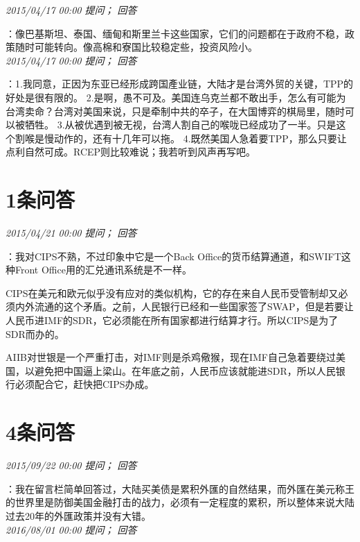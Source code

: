 \documentclass[twocolumn]{ctexart}
\begin{document}
\textit{\hfill\noindent\small 2015/04/17 00:00 提问； 回答}

：像巴基斯坦、泰国、缅甸和斯里兰卡这些国家，它们的问题都在于政府不稳，政策随时可能转向。像高棉和寮国比较稳定些，投资风险小。\\

\textit{\hfill\noindent\small 2015/04/17 00:00 提问； 回答}

：1.我同意，正因为东亚已经形成跨国產业链，大陆才是台湾外贸的关键，TPP的好处是很有限的。
2.是啊，愚不可及。美国连乌克兰都不敢出手，怎么有可能为台湾卖命？台湾对美国来说，只是牵制中共的卒子，在大国博弈的棋局里，随时可以被牺牲。
3.从被优遇到被无视，台湾人割自己的喉咙已经成功了一半。只是这个割喉是慢动作的，还有十几年可以拖。
4.既然美国人急着要TPP，那么只要让点利自然可成。RCEP则比较难说；我若听到风声再写吧。\\

\section{1条问答}

\textit{\hfill\noindent\small 2015/04/21 00:00 提问； 回答}

：我对CIPS不熟，不过印象中它是一个Back Office的货币结算通道，和SWIFT这种Front Office用的汇兑通讯系统是不一样。

CIPS在美元和欧元似乎没有应对的类似机构，它的存在来自人民币受管制却又必须内外流通的这个矛盾。之前，人民银行已经和一些国家签了SWAP，但是若要让人民币进IMF的SDR，它必须能在所有国家都进行结算才行。所以CIPS是为了SDR而办的。

AIIB对世银是一个严重打击，对IMF则是杀鸡儆猴，现在IMF自己急着要绕过美国，以避免把中国逼上梁山。在年底之前，人民币应该就能进SDR，所以人民银行必须配合它，赶快把CIPS办成。\\

\section{4条问答}

\textit{\hfill\noindent\small 2015/09/22 00:00 提问； 回答}

：我在留言栏简单回答过，大陆买美债是累积外匯的自然结果，而外匯在美元称王的世界里是防御美国金融打击的战力，必须有一定程度的累积，所以整体来说大陆过去20年的外匯政策并没有大错。\\

\textit{\hfill\noindent\small 2016/08/01 00:00 提问； 回答}
\end{document}
